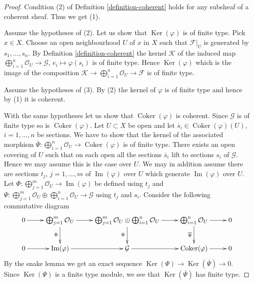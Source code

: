 \documentclass[10pt,a4paper]{amsart}
\theoremstyle{plain}
\theoremstyle{definition}
\theoremstyle{remark}
\numberwithin{equation}{subsection}
\def\Ker{\mathop{\mathrm{Ker}}}
\def\Im{\mathop{\mathrm{Im}}}
\def\Coker{\mathop{\mathrm{Coker}}}
\begin{document}
\begin{proof}
Condition (2) of Definition \ref{definition-coherent}
holds for any subsheaf of a coherent sheaf. Thus we get (1).

\medskip\noindent
Assume the hypotheses of (2).
Let us show that $\Ker(\varphi)$ is of finite type. Pick $x \in X$.
Choose an open neighbourhood $U$ of $x$ in $X$ such
that $\mathcal{F}|_U$ is generated by $s_1, \ldots, s_n$.
By Definition \ref{definition-coherent} the kernel $\mathcal{K}$
of the induced map
$\bigoplus_{i = 1}^n \mathcal{O}_U \to \mathcal{G}$,
$e_i \mapsto \varphi(s_i)$ is of finite type.
Hence $\Ker(\varphi)$ which is the image of the
composition
$\mathcal{K} \to \bigoplus_{i = 1}^n \mathcal{O}_U \to \mathcal{F}$
is of finite type.

\medskip\noindent
Assume the hypotheses of (3).
By (2) the kernel of $\varphi$ is of finite type and
hence by (1) it is coherent.

\medskip\noindent
With the same hypotheses let us show that $\Coker(\varphi)$ is coherent.
Since $\mathcal{G}$ is of finite type so is $\Coker(\varphi)$.
Let $U \subset X$ be open and let $\overline{s}_i \in \Coker(\varphi)(U)$,
$i = 1, \ldots, n$ be sections. We have to show that the kernel of the
associated morphism
$\overline{\Psi} : \bigoplus_{i = 1}^n \mathcal{O}_U \to \Coker(\varphi)$
is of finite type. There exists an open covering
of $U$ such that on each open all the sections $\overline{s}_i$
lift to sections $s_i$ of $\mathcal{G}$. Hence we may assume
this is the case over $U$. We may in addition assume there are
sections $t_j$, $j = 1, \ldots, m$ of $\Im(\varphi)$ over $U$
which generate $\Im(\varphi)$ over $U$.
Let $\Phi : \bigoplus_{j = 1}^m \mathcal{O}_U \to \Im(\varphi)$
be defined using $t_j$ and
$\Psi :
\bigoplus_{j = 1}^m \mathcal{O}_U \oplus
\bigoplus_{i = 1}^n \mathcal{O}_U \to \mathcal{G}$
using $t_j$ and $s_i$.
Consider the following commutative diagram
$$
\xymatrix{
0 \ar[r] &
\bigoplus_{j = 1}^m \mathcal{O}_U \ar[d]_\Phi \ar[r] &
\bigoplus_{j = 1}^m \mathcal{O}_U \oplus
\bigoplus_{i = 1}^n \mathcal{O}_U \ar[d]_\Psi \ar[r] &
\bigoplus_{i = 1}^n \mathcal{O}_U \ar[d]_{\overline{\Psi}} \ar[r] &
0 \\
0 \ar[r] &
\Im(\varphi) \ar[r] &
\mathcal{G} \ar[r] &
\Coker(\varphi) \ar[r] &
0
}
$$
By the snake lemma we get an exact sequence
$\Ker(\Psi) \to \Ker(\overline{\Psi}) \to 0$. Since $\Ker(\Psi)$
is a finite type module, we see that $\Ker(\overline{\Psi})$ has finite type.


\end{proof}
\end{document}
